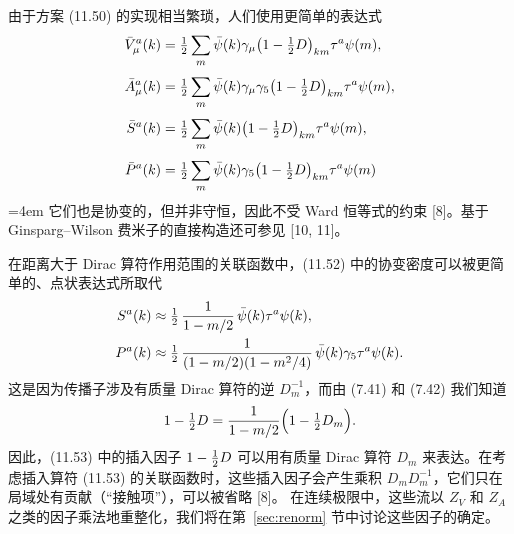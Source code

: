 由于方案 (11.50) 的实现相当繁琐，人们使用更简单的表达式
\begin{equation}
\begin{aligned}
\bar{V}_\mu^a(k) &=
\tfrac{1}{2} \sum_m \bar{\psi}(k)\gamma_\mu\bigl(1 - \tfrac{1}{2} D\bigr)_{km}\tau^a\psi(m) , \\[1mm]
\bar{A}_\mu^a(k) &=
\tfrac{1}{2} \sum_m \bar{\psi}(k)\gamma_\mu\gamma_5\bigl(1 - \tfrac{1}{2} D\bigr)_{km}\tau^a\psi(m) , \\[1mm]
\bar{S}^a(k) &=
\tfrac{1}{2} \sum_m \bar{\psi}(k)\bigl(1 - \tfrac{1}{2} D\bigr)_{km}\tau^a\psi(m) , \\[1mm]
\bar{P}^a(k) &=
\tfrac{1}{2} \sum_m \bar{\psi}(k)\gamma_5\bigl(1 - \tfrac{1}{2} D\bigr)_{km}\tau^a\psi(m)
\end{aligned}
\end{equation}
\begingroup\emergencystretch=4em 它们也是协变的，但并非守恒，因此不受 Ward 恒等式的约束 [8]。\linebreak[1]基于 Ginsparg–Wilson 费米子的直接构造还可参见 [10, 11]。\par\endgroup
在距离大于 Dirac 算符作用范围的关联函数中，(11.52) 中的协变密度可以被更简单的、点状表达式所取代
\begin{equation}
\begin{aligned}
S^a(k) &\approx \tfrac{1}{2}\, \frac{1}{1 - m/2}\,\bar{\psi}(k)\tau^a\psi(k) , \\
P^a(k) &\approx \tfrac{1}{2}\, \frac{1}{(1 - m/2)(1 - m^2/4)}\,\bar{\psi}(k)\gamma_5\tau^a\psi(k) .
\end{aligned}
\end{equation}
这是因为传播子涉及有质量 Dirac 算符的逆 $D_m^{-1}$，而由 (7.41) 和 (7.42) 我们知道
\begin{equation}
1 - \tfrac{1}{2} D = \frac{1}{1 - m/2}\Bigl(1 - \tfrac{1}{2} D_m\Bigr) .
\end{equation}
因此，(11.53) 中的插入因子 $1 - \tfrac{1}{2} D$ 可以用有质量 Dirac 算符 $D_m$ 来表达。在考虑插入算符 (11.53) 的关联函数时，这些插入因子会产生乘积 $D_m D_m^{-1}$，它们只在局域处有贡献（“接触项”），可以被省略 [8]。
在连续极限中，这些流以 $Z_V$ 和 $Z_A$ 之类的因子乘法地重整化，我们将在第~\ref{sec:renorm} 节中讨论这些因子的确定。

